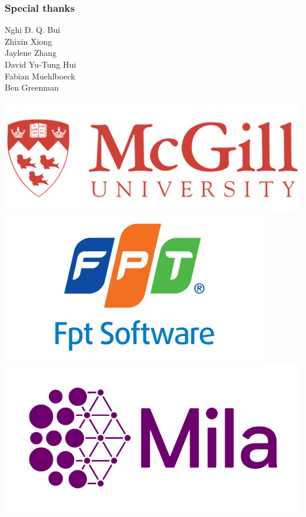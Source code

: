 \documentclass{beamer}
\begin{document}
    \begin{frame}
        \frametitle{Special thanks}
            \begin{center}
                \LARGE{
                    Nghi D. Q. Bui\\
                    Zhixin Xiong\\
                    Jaylene Zhang\\
                    David Yu-Tung Hui\\
                    Fabian Muehlboeck\\
                    Ben Greenman\\
                    \phantom{}\\
                }
                \href{https://cs.mcgill.ca}{\includegraphics[scale=0.08]{../figures/mcgill_logo.png}}
                \href{https://www.fpt-software.com}{\includegraphics[scale=0.19]{../figures/fpt_logo.png}}
                \href{https://mila.quebec}{\includegraphics[scale=0.13]{../figures/mila_logo.png}}
            \end{center}
    \end{frame}
\end{document}
